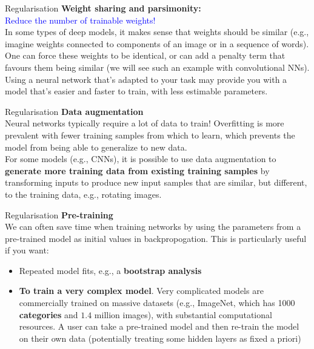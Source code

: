 \documentclass{beamer}
\begin{document}
\begin{frame}{Regularisation}
\textbf{Weight sharing and parsimonity:}\\
\textcolor{blue}{Reduce the number of trainable weights!}\\
In some types of deep models, it makes sense that weights should be similar (e.g., imagine weights connected to components of an image or in a sequence of words). One can force these weights to be identical, or can add a penalty term that favours them being similar (we will see such an example with convolutional NNs).\\
Using a neural network that's adapted to your task may provide you with a model that's easier and faster to train, with less estimable parameters.
\end{frame}

\begin{frame}{Regularisation}
\textbf{Data augmentation}\\
Neural networks typically require a lot of data to train! Overfitting is more prevalent with fewer training samples from which to learn, which prevents the model from being able to generalize to new data.\\

For some models (e.g., CNNs), it is possible to use data augmentation to \textbf{generate more training data from existing training samples} by transforming inputs to produce new input samples that are similar, but different, to the training data, e.g., rotating images. 
\end{frame}

\begin{frame}{Regularisation}
\textbf{Pre-training}\\
We can often save time when training networks by using the parameters from a pre-trained model as initial values in backpropogation. This is particularly useful if you want:
\begin{itemize}
\item Repeated model fits, e.g., a \textbf{bootstrap analysis}
\item \textbf{To train a very complex model}. Very complicated models are commercially trained on massive datasets (e.g., ImageNet, which has 1000 \textbf{categories} and $1.4$ million images), with substantial computational resources. A user can take a pre-trained model and then re-train the model on their own data (potentially treating some hidden layers as fixed a priori)
\end{itemize}
\end{frame}
\end{document}
